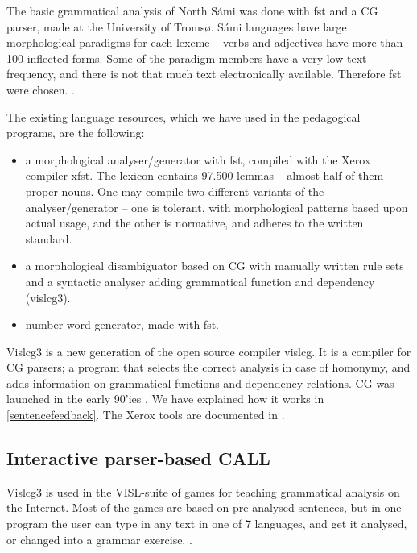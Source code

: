 \documentclass[11pt]{article}
\begin{document}
The basic grammatical analysis of North Sámi was done with fst and a CG parser, made at the University of Tromsø. Sámi languages have large morphological paradigms for each lexeme -- verbs and adjectives have more than 100 inflected forms. Some of the paradigm members have a very low text frequency, and there is not that much text electronically available. Therefore fst were chosen. \cite{Trosterud:07}.  

The existing language resources, which we have used in the pedagogical programs, are the following:

\begin{itemize}
\item a morphological analyser/generator with fst, compiled with the Xerox compiler xfst.  The lexicon contains 97.500 lemmas -- almost half of them proper nouns. One may compile two different variants of the analyser/generator -- one is tolerant, with morphological patterns based upon actual usage, and the other is normative, and adheres to the written standard. 
\item a morphological disambiguator based on CG with manually written rule sets and a syntactic analyser adding grammatical function and dependency (vislcg3). 
\item number word generator, made with fst.
\end{itemize}

Vislcg3 is a new generation of the open source compiler vislcg. It is a compiler for CG parsers; a program that selects the correct analysis in case of homonymy, and adds information on grammatical functions and dependency relations. CG was launched in the early 90'ies \cite{Karlsson:95}. We have explained how it works in \ref{sentencefeedback}. The Xerox tools are documented in \cite{BeesleyKarttunen:03}. 

\subsection{Interactive parser-based CALL}

Vislcg3 is used in the VISL-suite of games for teaching grammatical analysis on the Internet. Most of the games are based on pre-analysed sentences, but in one program the user can type in any text in one of 7 languages, and get it analysed, or changed into a grammar exercise. \cite{Bick:05}.
\end{document}
